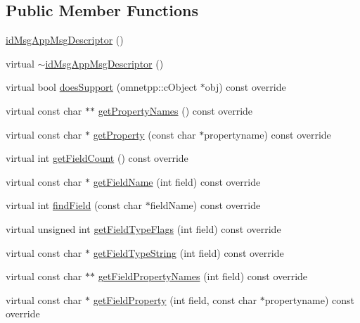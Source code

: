 \subsection*{Public Member Functions}
\begin{DoxyCompactItemize}
\item 
\hyperlink{classidMsgAppMsgDescriptor_a1f471f84ba71baffc0c0bedf29ff5522}{id\+Msg\+App\+Msg\+Descriptor} ()
\item 
virtual \hyperlink{classidMsgAppMsgDescriptor_a89b66128f3a50e738add1045dbb0e9b2}{$\sim$id\+Msg\+App\+Msg\+Descriptor} ()
\item 
virtual bool \hyperlink{classidMsgAppMsgDescriptor_ace75e5fffbe04839660617b19145128f}{does\+Support} (omnetpp\+::c\+Object $\ast$obj) const override
\item 
virtual const char $\ast$$\ast$ \hyperlink{classidMsgAppMsgDescriptor_a5da6527d679103a0cac6143a160813a7}{get\+Property\+Names} () const override
\item 
virtual const char $\ast$ \hyperlink{classidMsgAppMsgDescriptor_ac9b9240ff817b217015861a922206080}{get\+Property} (const char $\ast$propertyname) const override
\item 
virtual int \hyperlink{classidMsgAppMsgDescriptor_ae8280283eb1f21ecfa541b6e824d8008}{get\+Field\+Count} () const override
\item 
virtual const char $\ast$ \hyperlink{classidMsgAppMsgDescriptor_abc0d2c99d328bee5785de2d5df2a40e3}{get\+Field\+Name} (int field) const override
\item 
virtual int \hyperlink{classidMsgAppMsgDescriptor_a4b04258cc21a7b0c95fbb68719ac489d}{find\+Field} (const char $\ast$field\+Name) const override
\item 
virtual unsigned int \hyperlink{classidMsgAppMsgDescriptor_a9211adf741e2d9bb31f47d210297438e}{get\+Field\+Type\+Flags} (int field) const override
\item 
virtual const char $\ast$ \hyperlink{classidMsgAppMsgDescriptor_a0c976a9e1df2844d8e0897bf0eee8d5a}{get\+Field\+Type\+String} (int field) const override
\item 
virtual const char $\ast$$\ast$ \hyperlink{classidMsgAppMsgDescriptor_a55640ce6067dd59f8fc22cb8c3ce2f29}{get\+Field\+Property\+Names} (int field) const override
\item 
virtual const char $\ast$ \hyperlink{classidMsgAppMsgDescriptor_a69e69da2c64669ba7d0865a63e273e92}{get\+Field\+Property} (int field, const char $\ast$propertyname) const override
\item 

\end{DoxyCompactItemize}
